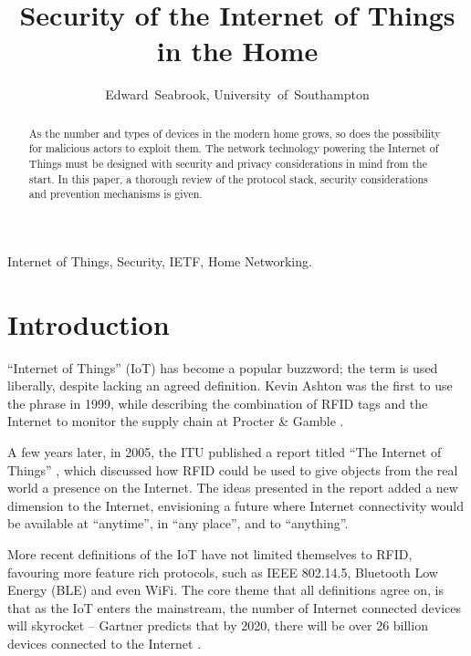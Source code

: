\documentclass[10pt,journal,compsoc]{IEEEtran}
\begin{document}
\title{Security of the Internet of Things in the Home}
\author{Edward~Seabrook, University~of~Southampton }

\maketitle

\begin{abstract}
As the number and types of devices in the modern home grows, so does the
possibility for malicious actors to exploit them. The network technology
powering the Internet of Things must be designed with security and privacy
considerations in mind from the start. In this paper, a thorough review of the
protocol stack, security considerations and prevention mechanisms is given. 
\end{abstract}

\begin{IEEEkeywords}
Internet of Things, Security, IETF, Home Networking.
\end{IEEEkeywords}

\IEEEpeerreviewmaketitle

\section{Introduction}
 ``Internet of Things'' (IoT) has become a popular
buzzword; the term is used liberally, despite lacking an agreed definition.
Kevin Ashton was the first to use the phrase in 1999, while describing the
combination of RFID tags and the Internet to monitor the supply chain at
Procter \& Gamble \cite{Ashton2009}. 

A few years later, in 2005, the ITU published a report titled ``The Internet of
Things'' \cite{ITU_IoT}, which discussed how RFID could be used to give objects
from the real world a presence on the Internet. The ideas presented in the
report added a new dimension to the Internet, envisioning a future where
Internet connectivity would be available at ``anytime'', in ``any place'', and
to ``anything''.

More recent definitions of the IoT have not limited themselves to RFID,
favouring more feature rich protocols, such as IEEE 802.14.5, Bluetooth Low
Energy (BLE) and even WiFi. The core theme that all definitions agree on, is
that as the IoT enters the mainstream, the number of Internet connected devices
will skyrocket -- Gartner predicts that by 2020, there will be over 26 billion
devices connected to the Internet \cite{Gartner2014}. 
\end{document}

